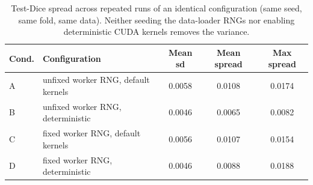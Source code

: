 \begin{table}[t]
\centering
\footnotesize
\caption{Test-Dice spread across repeated runs of an identical configuration (same seed, same fold, same data). Neither seeding the data-loader RNGs nor enabling deterministic CUDA kernels removes the variance.}
\label{tab:variance}
\begin{tabular}{llccc}
\toprule
Cond. & Configuration & Mean sd & Mean spread & Max spread \\
\midrule
A & unfixed worker RNG, default kernels & 0.0058 & 0.0108 & 0.0174 \\
B & unfixed worker RNG, deterministic & 0.0046 & 0.0065 & 0.0082 \\
C & fixed worker RNG, default kernels & 0.0056 & 0.0107 & 0.0154 \\
D & fixed worker RNG, deterministic & 0.0046 & 0.0088 & 0.0188 \\
\bottomrule
\end{tabular}
\end{table}
